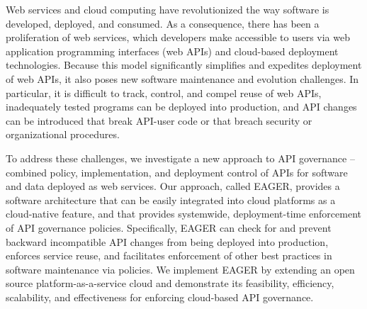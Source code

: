 Web services and cloud computing have revolutionized the way software is
developed, deployed, and consumed.  As a consequence, there has been a
proliferation of web services, which developers make accessible to users via
web application programming interfaces (web APIs) and cloud-based deployment
technologies.  Because this model significantly simplifies and expedites
deployment of web APIs, it also poses new software maintenance and evolution
challenges.  In particular, it is difficult to track, control, and compel
reuse of web APIs, inadequately tested programs can be
deployed into production, and API changes can be introduced that
break API-user code or that breach security or organizational procedures.

To address these challenges, we investigate a new approach to API governance
-- combined policy, implementation, and deployment control of APIs for
software and data deployed as web services.  Our approach, called EAGER,
provides a software architecture that can be easily integrated into cloud
platforms as a cloud-native feature, and that provides systemwide, 
deployment-time enforcement of API governance policies.
Specifically, EAGER can check for and
prevent backward incompatible API changes from
being deployed into production,
enforces service reuse, and facilitates enforcement of other best practices
in software maintenance via policies.  We implement EAGER by
extending an open source platform-as-a-service cloud and
demonstrate its feasibility, efficiency,
scalability, and effectiveness for enforcing cloud-based API governance.

